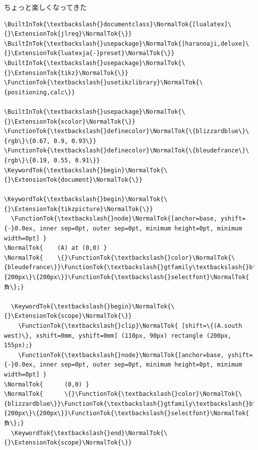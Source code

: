 \documentclass[unicode,14pt]{beamer}
\begin{document}
\begin{frame}[fragile]{ちょっと楽しくなってきた}
  \sffamily
  \vspace*{-\baselineskip}
  \begin{tcolorbox}
  \HUGE{4.5pt}{6pt}
  \begin{Verbatim}[commandchars=\\\{\}, breaklines=true, breakanywhere=true]
\BuiltInTok{\textbackslash{}documentclass}\NormalTok{[lualatex]\{}\ExtensionTok{jlreq}\NormalTok{\}}
\BuiltInTok{\textbackslash{}usepackage}\NormalTok{[haranoaji,deluxe]\{}\ExtensionTok{luatexja{-}preset}\NormalTok{\}}
\BuiltInTok{\textbackslash{}usepackage}\NormalTok{\{}\ExtensionTok{tikz}\NormalTok{\}}
\FunctionTok{\textbackslash{}usetikzlibrary}\NormalTok{\{positioning,calc\}}

\BuiltInTok{\textbackslash{}usepackage}\NormalTok{\{}\ExtensionTok{xcolor}\NormalTok{\}}
\FunctionTok{\textbackslash{}definecolor}\NormalTok{\{blizzardblue\}\{rgb\}\{0.67, 0.9, 0.93\}}
\FunctionTok{\textbackslash{}definecolor}\NormalTok{\{bleudefrance\}\{rgb\}\{0.19, 0.55, 0.91\}}
\KeywordTok{\textbackslash{}begin}\NormalTok{\{}\ExtensionTok{document}\NormalTok{\}}

\KeywordTok{\textbackslash{}begin}\NormalTok{\{}\ExtensionTok{tikzpicture}\NormalTok{\}}
  \FunctionTok{\textbackslash{}node}\NormalTok{[anchor=base, yshift={-}0.0ex, inner sep=0pt, outer sep=0pt, minimum height=0pt, minimum width=0pt] }
\NormalTok{    (A) at (0,0) }
\NormalTok{    \{}\FunctionTok{\textbackslash{}color}\NormalTok{\{bleudefrance\}}\FunctionTok{\textbackslash{}gtfamily\textbackslash{}bfseries\textbackslash{}fontsize}\NormalTok{\{200px\}\{200px\}}\FunctionTok{\textbackslash{}selectfont}\NormalTok{ 負\};}

  \KeywordTok{\textbackslash{}begin}\NormalTok{\{}\ExtensionTok{scope}\NormalTok{\}}
    \FunctionTok{\textbackslash{}clip}\NormalTok{ [shift=\{(A.south west)\}, xshift=0mm, yshift=0mm] (110px, 90px) rectangle (200px, 155px);}
    \FunctionTok{\textbackslash{}node}\NormalTok{[anchor=base, yshift={-}0.0ex, inner sep=0pt, outer sep=0pt, minimum height=0pt, minimum width=0pt] }
\NormalTok{      (0,0) }
\NormalTok{      \{}\FunctionTok{\textbackslash{}color}\NormalTok{\{blizzardblue\}}\FunctionTok{\textbackslash{}gtfamily\textbackslash{}bfseries\textbackslash{}fontsize}\NormalTok{\{200px\}\{200px\}}\FunctionTok{\textbackslash{}selectfont}\NormalTok{ 負\};}
  \KeywordTok{\textbackslash{}end}\NormalTok{\{}\ExtensionTok{scope}\NormalTok{\}}


\end{Verbatim}
\end{tcolorbox}
\end{frame}
\end{document}

